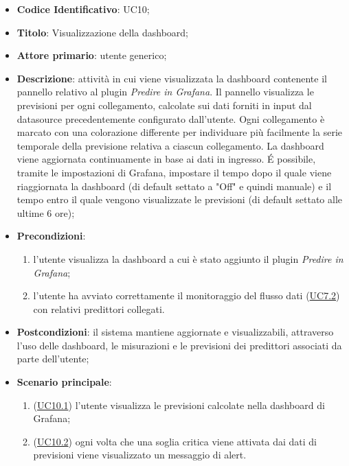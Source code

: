 		\begin{itemize}
			\item\textbf{Codice Identificativo}: UC10;
			\item\textbf{Titolo}: Visualizzazione della dashboard;
			\item\textbf{Attore primario}: utente generico;
			\item\textbf{Descrizione}: attività in cui viene visualizzata la dashboard contenente il pannello relativo al plugin \textit{Predire in Grafana}. Il pannello visualizza le previsioni per ogni collegamento, calcolate sui dati forniti in input dal datasource precedentemente configurato dall'utente. Ogni collegamento è marcato con una colorazione differente per individuare più facilmente la serie temporale della previsione relativa a ciascun collegamento. La dashboard viene aggiornata continuamente in base ai dati in ingresso. \'E possibile, tramite le impostazioni di Grafana, impostare il tempo dopo il quale viene riaggiornata la dashboard (di default settato a "Off" e quindi manuale) e il tempo entro il quale vengono visualizzate le previsioni (di default settato alle ultime 6 ore); 
			\item\textbf{Precondizioni}: 
			\begin{enumerate}
				\item l'utente visualizza la dashboard a cui è stato aggiunto il plugin \textit{Predire in Grafana};
				\item l'utente ha avviato correttamente il monitoraggio del flusso dati (\hyperref[par:UC7.2]{UC7.2}) con relativi predittori collegati.
			\end{enumerate}				
			\item\textbf{Postcondizioni}: il sistema mantiene aggiornate e visualizzabili, attraverso l'uso delle dashboard, le misurazioni e le previsioni dei predittori associati da parte dell'utente;
			\item\textbf{Scenario principale}: 
			\begin{enumerate}
				\item (\hyperref[par:UC10.1]{UC10.1}) l'utente visualizza le previsioni calcolate nella dashboard di Grafana;
				\item (\hyperref[par:UC10.2]{UC10.2}) ogni volta che una soglia critica viene attivata dai dati di previsioni viene visualizzato un messaggio di alert.
			\end{enumerate}
				
		\end{itemize}
		

